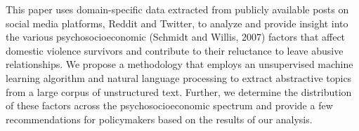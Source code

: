 This paper uses domain-specific data extracted from publicly available posts on social media platforms, Reddit and Twitter, to analyze and provide insight into the various psychosocioeconomic (Schmidt and Willis, 2007) factors that affect domestic violence survivors and contribute to their reluctance to leave abusive relationships. We propose a methodology that employs an unsupervised machine learning algorithm and natural language processing to extract abstractive topics from a large corpus of unstructured text. Further, we determine the distribution of these factors across the psychosocioeconomic spectrum and provide a few recommendations for policymakers based on the results of our analysis.
